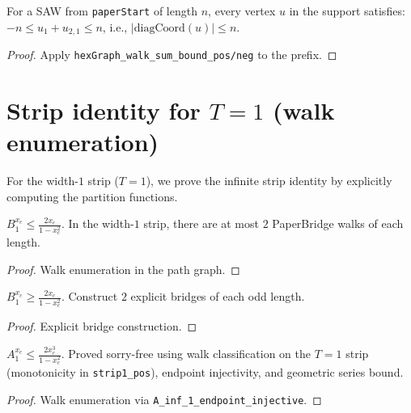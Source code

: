 \begin{lemma}
\begin{lemma}\label{lem:saw_diag_bounds}
\leanok
{}
  For a SAW from \texttt{paperStart} of length $n$,
  every vertex $u$ in the support satisfies:
  $-n \leq u_1 + u_{2,1} \leq n$, i.e., $|\mathrm{diagCoord}(u)| \leq n$.
\end{lemma}
\begin{proof}\leanok
  Apply \texttt{hexGraph\_walk\_sum\_bound\_pos/neg} to the prefix.
\end{proof}

\section{Strip identity for $T = 1$ (walk enumeration)}\label{sec:strip_T1_identity}

For the width-$1$ strip ($T = 1$), we prove the infinite strip identity
by explicitly computing the partition functions.

\begin{lemma}[Paper bridge partition for $T = 1$: upper bound]\label{lem:bridge_part_1_le}
  $B_1^{x_c} \leq \frac{2x_c}{1 - x_c^2}$.
  In the width-$1$ strip, there are at most $2$ PaperBridge walks
  of each length.
\end{lemma}
\begin{proof} Walk enumeration in the path graph. \end{proof}

\begin{lemma}[Paper bridge partition for $T = 1$: lower bound]\label{lem:bridge_part_1_ge}
  $B_1^{x_c} \geq \frac{2x_c}{1 - x_c^2}$.
  Construct $2$ explicit bridges of each odd length.
\end{lemma}
\begin{proof} Explicit bridge construction. \end{proof}

\begin{lemma}[$A_{\inf}$ for $T = 1$: upper bound]\label{lem:A_inf_1_le}
\leanok
{}
  $A_1^{x_c} \leq \frac{2x_c^3}{1 - x_c^2}$.
  Proved sorry-free using walk classification on the $T=1$ strip
  (monotonicity in \texttt{strip1\_pos}), endpoint injectivity, and geometric
  series bound.
\end{lemma}
\begin{proof}\leanok Walk enumeration via \texttt{A\_inf\_1\_endpoint\_injective}. \end{proof}


\end{lemma}
